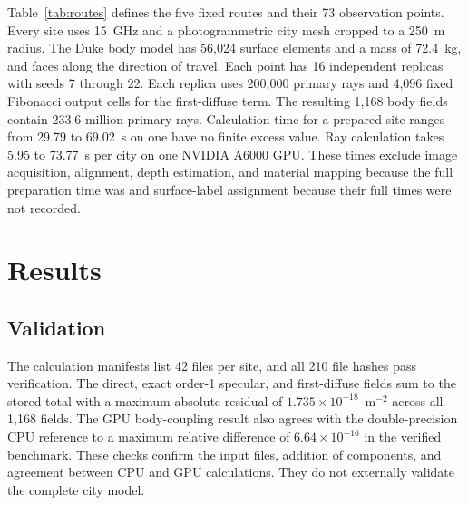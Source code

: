 \documentclass{IEEEoj} %
\providecommand{\DIFadd}[1]{{\protect\color{blue} \sf #1}} %
\providecommand{\DIFdel}[1]{{\protect\color{red} \scriptsize #1}} %
\providecommand{\DIFaddbegin}{} %
\providecommand{\DIFaddend}{} %
\providecommand{\DIFdelbegin}{} %
\providecommand{\DIFdelend}{} %
\begin{document}
\DIFdel{Table~\ref{tab:routes} defines the five fixed routes and their 73 observation
points. Every site uses 15~GHz and a photogrammetric city mesh cropped to a
250~m radius. The Duke body model has 56,024 surface elements and a mass of
72.4~kg, and faces along the direction of travel. Each point has 16 independent
replicas with seeds 7 through 22. Each replica uses 200,000 primary rays and
4,096 fixed Fibonacci output cells for the first-diffuse term. The resulting 1,168 body fields contain 233.6 million primary rays.
Calculation time for a prepared site ranges from 29.79 to 69.02~s on one }\DIFdelend \DIFaddbegin \DIFadd{have no finite excess value. Ray calculation
takes 5.95 to 73.77~s per city on one NVIDIA }\DIFaddend A6000 GPU. These times exclude
image acquisition, alignment, \DIFdelbegin \DIFdel{depth estimation, and material mapping because the full
preparation time was }\DIFdelend \DIFaddbegin \DIFadd{and surface-label assignment because their full
times were }\DIFaddend not recorded.

\DIFaddbegin \section{\DIFadd{Results}}
\label{sec:results}

\DIFaddend \subsection{Validation}
\label{sec:validation}

\DIFdelbegin \DIFdel{The calculation manifests list 42 files per site, and all 210 file hashes pass
verification. The direct, exact order-1 specular, and first-diffuse fields sum
to the stored total with a maximum absolute residual of
$1.735\times10^{-18}$~m$^{-2}$ across all 1,168 fields. The GPU body-coupling
result also agrees with the double-precision CPU reference to a maximum relative
difference of $6.64\times10^{-16}$ in the verified benchmark. These checks
confirm the input files, addition of components, and agreement between CPU and
GPU calculations. They do not externally validate the complete city model.
}%
\end{document}
